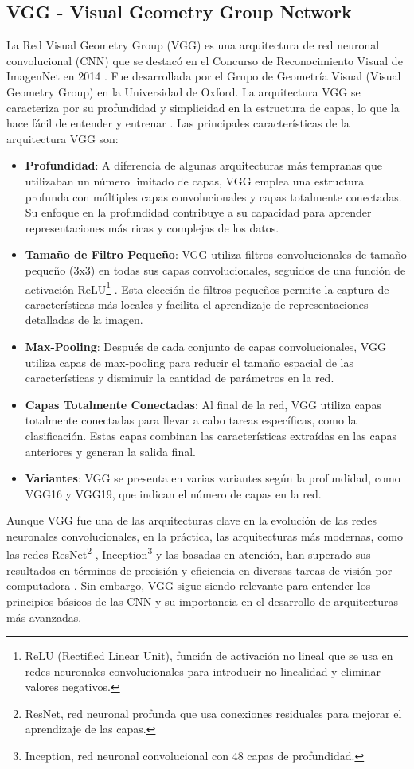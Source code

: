 \documentclass[12pt,twoside,titlepage]{ingenius}
\begin{document}
\begin{multicols}{2}
\subsection{VGG - Visual Geometry Group Network}
La Red Visual Geometry Group (VGG) es una arquitectura de red neuronal convolucional (CNN) que se destacó en el Concurso de Reconocimiento Visual de ImagenNet en 2014 \cite{11}. Fue desarrollada por el Grupo de Geometría Visual (Visual Geometry Group) en la Universidad de Oxford. La arquitectura VGG se caracteriza por su profundidad y simplicidad en la estructura de capas, lo que la hace fácil de entender y entrenar \cite{12}.
Las principales características de la arquitectura VGG son:
\begin{itemize}
	\item \textbf{Profundidad}: A diferencia de algunas arquitecturas más tempranas que utilizaban un número limitado de capas, VGG emplea una estructura profunda con múltiples capas convolucionales y capas totalmente conectadas. Su enfoque en la profundidad contribuye a su capacidad para aprender representaciones más ricas y complejas de los datos.
	\item \textbf{Tamaño de Filtro Pequeño}: VGG utiliza filtros convolucionales de tamaño pequeño (3x3) en todas sus capas convolucionales, seguidos de una función de activación ReLU\footnote{ReLU (Rectified Linear Unit), función de activación no lineal que se usa en redes neuronales convolucionales para introducir no linealidad y eliminar valores negativos.} . Esta elección de filtros pequeños permite la captura de características más locales y facilita el aprendizaje de representaciones detalladas de la imagen.
	\item \textbf{Max-Pooling}: Después de cada conjunto de capas convolucionales, VGG utiliza capas de max-pooling para reducir el tamaño espacial de las características y disminuir la cantidad de parámetros en la red.
	\item \textbf{Capas Totalmente Conectadas}: Al final de la red, VGG utiliza capas totalmente conectadas para llevar a cabo tareas específicas, como la clasificación. Estas capas combinan las características extraídas en las capas anteriores y generan la salida final.
	\item \textbf{Variantes}: VGG se presenta en varias variantes según la profundidad, como VGG16 y VGG19, que indican el número de capas en la red.
\end{itemize}

Aunque VGG fue una de las arquitecturas clave en la evolución de las redes neuronales convolucionales, en la práctica, las arquitecturas más modernas, como las redes ResNet\footnote{ResNet, red neuronal profunda que usa conexiones residuales para mejorar el aprendizaje de las capas.} , Inception\footnote{Inception, red neuronal convolucional con 48 capas de profundidad.}  y las basadas en atención, han superado sus resultados en términos de precisión y eficiencia en diversas tareas de visión por computadora \cite{13}. Sin embargo, VGG sigue siendo relevante para entender los principios básicos de las CNN y su importancia en el desarrollo de arquitecturas más avanzadas. 


\end{multicols}
\end{document}
